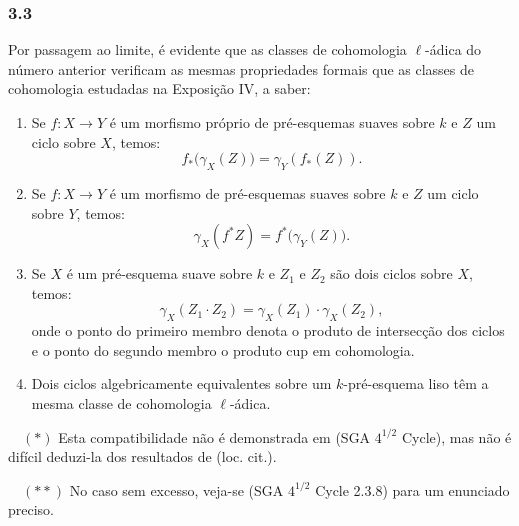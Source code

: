 \subsubsection*{3.3}
Por passagem ao limite, é evidente que as classes de cohomologia \(\ell\)-ádica do número anterior verificam as mesmas propriedades formais que as classes de cohomologia estudadas na Exposição IV, a saber:

\begin{enumerate}[label=(\roman*)]
\item Se \(f:X\to Y\) é um morfismo próprio de pré-esquemas suaves sobre \(k\) e \(Z\) um ciclo sobre \(X\), temos:
\[
f_*\bigl(\gamma_X(Z)\bigr)=\gamma_Y(f_*(Z)).
\tag{*}
\]

\item Se \(f:X\to Y\) é um morfismo de pré-esquemas suaves sobre \(k\) e \(Z\) um ciclo sobre \(Y\), temos:
\[
\gamma_X(f^*Z)=f^*\bigl(\gamma_Y(Z)\bigr).
\tag{**}
\]

\item Se \(X\) é um pré-esquema suave sobre \(k\) e \(Z_1\) e \(Z_2\) são dois ciclos sobre \(X\), temos:
\[
\gamma_X(Z_1\cdot Z_2)=\gamma_X(Z_1)\cdot \gamma_X(Z_2),
\tag{**}
\]
onde o ponto do primeiro membro denota o produto de intersecção dos ciclos e o ponto do segundo membro o produto cup em cohomologia.

\item Dois ciclos algebricamente equivalentes sobre um \(k\)-pré-esquema liso têm a mesma classe de cohomologia \(\ell\)-ádica.
\end{enumerate}

\begin{flushleft}
\(\quad (*)\) Esta compatibilidade não é demonstrada em (SGA \(4^{1/2}\) Cycle), mas não é difícil deduzi-la dos resultados de (loc. cit.).

\(\quad (**)\) No caso sem excesso, veja-se (SGA \(4^{1/2}\) Cycle 2.3.8) para um enunciado preciso.
\end{flushleft}
